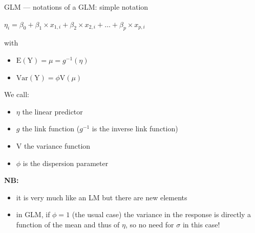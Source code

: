 \documentclass[
  10pt,
  ignorenonframetext,
  aspectratio=169,
  t]{beamer}
\providecommand{\tightlist}{%
  \setlength{\itemsep}{0pt}\setlength{\parskip}{0pt}}
\begin{document}
\begin{frame}{GLM --- notations of a GLM: simple notation}
\protect{}\label{glm-notations-of-a-glm-simple-notation}
\vspace{1em}

\begin{center}
$\eta_i = \beta_0 + \beta_1 \times x_{1,i} + \beta_2 \times x_{2,i} + \dots + \beta_{p} \times x_{p,i}$
\end{center}

with

\begin{itemize}
\item $\text{E}(\text{Y}) = \mu = g^{-1}(\eta)$
\item $\text{Var}(\text{Y}) = \phi\text{V}(\mu)$
\end{itemize}

We call:

\begin{itemize}
\tightlist
\item
  \(\eta\) the linear predictor
\item
  \(g\) the link function (\(g^{-1}\) is the inverse link function)
\item
  \(\text{V}\) the variance function
\item
  \(\phi\) is the dispersion parameter
\end{itemize}

\textbf{NB:}

\begin{itemize}
\tightlist
\item
  it is very much like an LM but there are new elements
\item
  in GLM, if \(\phi = 1\) (the usual case) the variance in the response
  is directly a function of the mean and thus of \(\eta\), so no need
  for \(\sigma\) in this case!
\end{itemize}
\end{frame}
\end{document}
